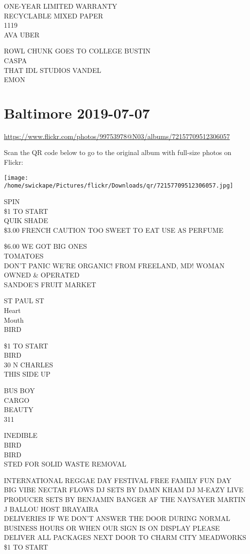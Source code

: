 \documentclass[10pt,letterpaper]{article}
\begin{document}
ONE{-}YEAR LIMITED WARRANTY\\
RECYCLABLE MIXED PAPER\\
1119\\
AVA UBER

ROWL CHUNK GOES TO COLLEGE BUSTIN\\
CASPA\\
THAT IDL STUDIOS VANDEL\\
EMON


\section*{Baltimore 2019-07-07}

\url{https://www.flickr.com/photos/99753978@N03/albums/72157709512306057}

Scan the QR code below to go to the original album with full-size photos on Flickr:

\texttt{[image: /home/swickape/Pictures/flickr/Downloads/qr/72157709512306057.jpg]}


SPIN\\
\$1 TO START\\
QUIK SHADE\\
\$3.00 FRENCH CAUTION TOO SWEET TO EAT USE AS PERFUME

\$6.00 WE GOT BIG ONES\\
TOMATOES\\
DON'T PANIC WE'RE ORGANIC!  FROM FREELAND, MD!  WOMAN OWNED \& OPERATED\\
SANDOE'S FRUIT MARKET

ST PAUL ST\\
Heart\\
Mouth\\
BIRD

\$1 TO START\\
BIRD\\
30 N CHARLES\\
THIS SIDE UP

BUS BOY\\
CARGO\\
BEAUTY\\
311

INEDIBLE\\
BIRD\\
BIRD\\
STED FOR SOLID WASTE REMOVAL

INTERNATIONAL REGGAE DAY FESTIVAL FREE FAMILY FUN DAY\\
BIG VIBE NECTAR FLOWS DJ SETS BY DAMN KHAM DJ M{-}EAZY LIVE PRODUCER SETS BY BENJAMIN BANGER AF THE NAYSAYER MARTIN J BALLOU HOST BRAYAIRA\\
DELIVERIES IF WE DON'T ANSWER THE DOOR DURING NORMAL BUSINESS HOURS OR WHEN OUR SIGN IS ON DISPLAY PLEASE DELIVER ALL PACKAGES NEXT DOOR TO CHARM CITY MEADWORKS\\
\$1 TO START
\end{document}
